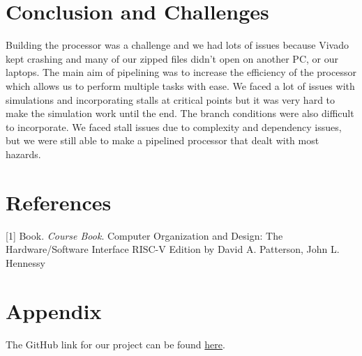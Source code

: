 \documentclass[12pt]{article}
\begin{document}
\section{Conclusion and Challenges}\label{performance}
    Building the processor was a challenge and we had lots of issues because Vivado kept crashing and many of our zipped files didn't open on another PC, or our laptops. The main aim of pipelining was to increase the efficiency of the processor which allows us to perform multiple tasks with ease. We faced a lot of issues with simulations and incorporating stalls at critical points but it was very hard to make the simulation work until the end. The branch conditions were also difficult to incorporate. We faced stall issues due to complexity and dependency issues, but we were still able to make a pipelined processor that dealt with most hazards.

\section{References}

[1] Book. \textit{Course Book}. Computer Organization and Design: The Hardware/Software Interface RISC-V Edition by David A. Patterson, John L. Hennessy

\section{Appendix}
The GitHub link for our project can be found \href{https://github.com/haniakashif/CA-Project-Fall-23/tree/main}{here}.

    
\end{document}
